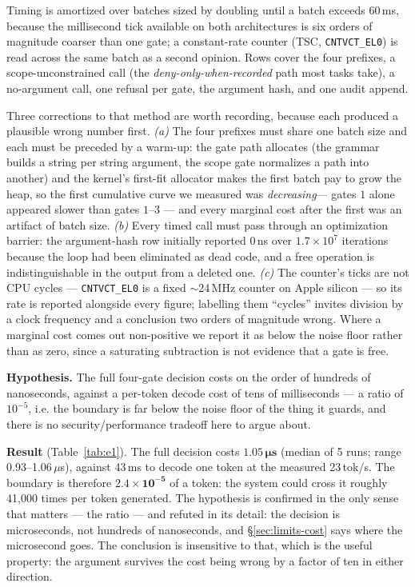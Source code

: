 \documentclass[11pt]{article}
\newcommand{\code}[1]{\texttt{#1}}
\begin{document}
Timing is amortized over batches sized by doubling until a batch exceeds
60\,ms, because the millisecond tick available on both architectures is six
orders of magnitude coarser than one gate; a constant-rate counter (TSC,
\code{CNTVCT\_EL0}) is read across the same batch as a second opinion. Rows
cover the four prefixes, a scope-unconstrained call (the
\emph{deny-only-when-recorded} path most tasks take), a no-argument call, one
refusal per gate, the argument hash, and one audit append.

Three corrections to that method are worth recording, because each produced a
plausible wrong number first. \emph{(a)} The four prefixes must share one batch
size and each must be preceded by a warm-up: the gate path allocates (the
grammar builds a string per string argument, the scope gate normalizes a path
into another) and the kernel's first-fit allocator makes the first batch pay to
grow the heap, so the first cumulative curve we measured was
\emph{decreasing}--- gates $1$ alone appeared slower than gates $1$--$3$ ---
and every marginal cost after the first was an artifact of batch size.
\emph{(b)} Every timed call must pass through an optimization barrier: the
argument-hash row initially reported $0$\,ns over $1.7\times10^{7}$ iterations
because the loop had been eliminated as dead code, and a free operation is
indistinguishable in the output from a deleted one. \emph{(c)} The counter's
ticks are not CPU cycles --- \code{CNTVCT\_EL0} is a fixed $\sim$24\,MHz counter
on Apple silicon --- so its rate is reported alongside every figure; labelling
them ``cycles'' invites division by a clock frequency and a conclusion two
orders of magnitude wrong. Where a marginal cost comes out non-positive we
report it as below the noise floor rather than as zero, since a saturating
subtraction is not evidence that a gate is free.

\textbf{Hypothesis.} The full four-gate decision costs on the order of
hundreds of nanoseconds, against a per-token decode cost of tens of
milliseconds --- a ratio of $10^{-5}$, i.e. the boundary is far below the noise
floor of the thing it guards, and there is no security/performance tradeoff
here to argue about.

\textbf{Result} (Table~\ref{tab:e1}). The full decision costs
$\mathbf{1.05\,\mu s}$ (median of 5 runs; range 0.93--1.06\,$\mu$s), against
43\,ms to decode one token at the measured 23\,tok/s. The boundary is therefore
$\mathbf{2.4\times10^{-5}}$ of a token: the system could cross it roughly
41{,}000 times per token generated. The hypothesis is confirmed in the only sense that
matters --- the ratio --- and refuted in its detail: the decision is
microseconds, not hundreds of nanoseconds, and \S\ref{sec:limits-cost} says
where the microsecond goes. The conclusion is insensitive to that, which is the
useful property: the argument survives the cost being wrong by a factor of ten
in either direction.
\end{document}
